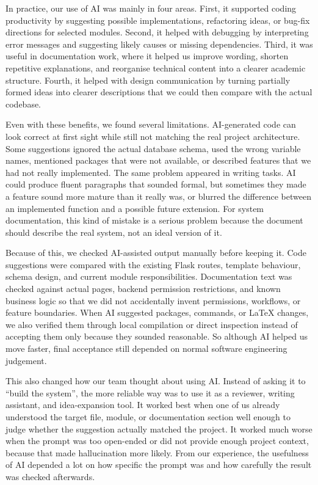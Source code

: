 \documentclass[10pt,a4paper]{article}
\begin{document}
In practice, our use of AI was mainly in four areas. First, it supported coding productivity by suggesting possible implementations, refactoring ideas, or bug-fix directions for selected modules. Second, it helped with debugging by interpreting error messages and suggesting likely causes or missing dependencies. Third, it was useful in documentation work, where it helped us improve wording, shorten repetitive explanations, and reorganise technical content into a clearer academic structure. Fourth, it helped with design communication by turning partially formed ideas into clearer descriptions that we could then compare with the actual codebase.

Even with these benefits, we found several limitations. AI-generated code can look correct at first sight while still not matching the real project architecture. Some suggestions ignored the actual database schema, used the wrong variable names, mentioned packages that were not available, or described features that we had not really implemented. The same problem appeared in writing tasks. AI could produce fluent paragraphs that sounded formal, but sometimes they made a feature sound more mature than it really was, or blurred the difference between an implemented function and a possible future extension. For system documentation, this kind of mistake is a serious problem because the document should describe the real system, not an ideal version of it.

Because of this, we checked AI-assisted output manually before keeping it. Code suggestions were compared with the existing Flask routes, template behaviour, schema design, and current module responsibilities. Documentation text was checked against actual pages, backend permission restrictions, and known business logic so that we did not accidentally invent permissions, workflows, or feature boundaries. When AI suggested packages, commands, or LaTeX changes, we also verified them through local compilation or direct inspection instead of accepting them only because they sounded reasonable. So although AI helped us move faster, final acceptance still depended on normal software engineering judgement.

This also changed how our team thought about using AI. Instead of asking it to ``build the system'', the more reliable way was to use it as a reviewer, writing assistant, and idea-expansion tool. It worked best when one of us already understood the target file, module, or documentation section well enough to judge whether the suggestion actually matched the project. It worked much worse when the prompt was too open-ended or did not provide enough project context, because that made hallucination more likely. From our experience, the usefulness of AI depended a lot on how specific the prompt was and how carefully the result was checked afterwards.
\end{document}
